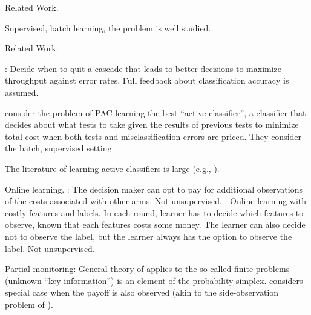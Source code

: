 %
%

Related Work.

Supervised, batch learning, the problem is well studied.

Related Work: \cite{AISTATS13_SupervisedSequentialLearning_TrapezSaligram}

\cite{poczos2009}: Decide when to quit a cascade that leads to better decisions to maximize throughput against error rates. Full feedback about classification accuracy is assumed.

\citet{ActiveClass-AIJ-s} consider the problem of PAC learning the best ``active classifier'',
a classifier that decides about what tests to take given the results of previous tests
to minimize total cost when both tests and misclassification errors are priced.
They consider the batch, supervised setting. 

The literature of learning active classifiers is large 
(e.g., \citep{LCunderBudget-ECML05,ADORE-99,isukapalli01efficient-ICJAI}).


Online learning.
\cite{SBCA14:BanditsPaid}: The decision maker can opt to pay for additional observations of the costs associated with other arms. Not unsupervised.
\citet{ZBGGySz13:CostlyFeatures}: Online learning with costly features and labels.
In each round, learner has to decide which features to observe, known that each features costs 
some money. The learner can also decide not to observe the label, but the learner always has the option
to observe the label. Not unsupervised.

Partial monitoring:
General theory of \citet{BaFoPaRaSze14} 
applies to the so-called finite problems (unknown ``key information'') is an element of the probability simplex.
\citet{AgTeAn89:pmon} considers special case when the payoff is also observed (akin to the side-observation problem of \citet{MaSh11}).

